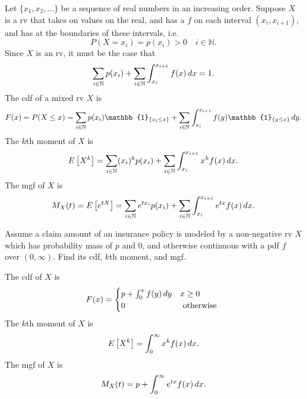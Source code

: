 \documentclass[notoc,notitlepage]{tufte-book}
\begin{document}
\begin{note}
  Let $\{ x_1, x_2, ... \}$ be a sequence of real numbers in an increasing order. Suppose $X$ is a rv that takes on values on the real, and has a  $f$ on each interval $(x_i, x_{i + 1})$, and has  at the boundaries of these intervals, i.e.
  \begin{equation*}
    P(X = x_i) = p(x_i) > 0 \quad i \in \mathbb{N}.
  \end{equation*}
  Since $X$ is an rv, it must be the case that
  \begin{equation*}
    \sum_{i \in \mathbb{N}} p(x_i) + \sum_{i \in \mathbb{N}} \int_{x_i}^{x_{i + 1}} f(x) \mathop{}\!d{x}  = 1.
  \end{equation*}
  The cdf of a mixed rv $X$ is
  \begin{equation*}
    F(x) = P(X \leq x) = \sum_{i \in \mathbb{N}} p(x_i) \mathbb{1}_{\{x_i \leq x\}} + \sum_{i \in \mathbb{N}} \int_{x_i}^{x_{i + 1}} f(y) \mathbb{1}_{\{ y \leq x \} } \dif{y}.
  \end{equation*}
  The $k$th moment of $X$ is
  \begin{equation*}
    E\left[X^k\right] = \sum_{i \in \mathbb{N}} (x_i)^k p(x_i) + \sum_{i \in \mathbb{N}} \int_{x_i}^{x_{i + 1}} x^k f(x) \mathop{}\!d{x}.
  \end{equation*}
  The mgf of $X$ is
  \begin{equation*}
    M_X(t) = E\left[ e^{tX} \right] = \sum_{i \in \mathbb{N}} e^{tx_i} p(x_i) + \sum_{i \in \mathbb{N}} \int_{x_i}^{x_{i + 1}} e^{tx} f(x) \mathop{}\!d{x}.
  \end{equation*}
\end{note}

\begin{eg}
  Assume a claim amount of an insurance policy is modeled by a non-negative rv $X$ which has probability mass of $p$ and $0$, and otherwise continuous with a pdf $f$ over $(0, \infty)$. Find its cdf, $k$th moment, and mgf.
\end{eg}

\begin{solution}
  The cdf of $X$ is
  \begin{equation*}
    F(x) = \begin{cases}
      p + \int_{0}^{x} f(y) \mathop{}\!d{y} & x \geq 0 \\
      0                             & \text{ otherwise }
    \end{cases}
  \end{equation*}
  The $k$th moment of $X$ is
  \begin{equation*}
    E\left[ X^k \right] = \int_{0}^{\infty} x^k f(x) \mathop{}\!d{x}.
  \end{equation*}
  The mgf of $X$ is
  \begin{equation*}
    M_X(t) = p + \int_{0}^{\infty} e^{tx} f(x) \mathop{}\!d{x}.
  \end{equation*}
\end{solution}
\end{document}

